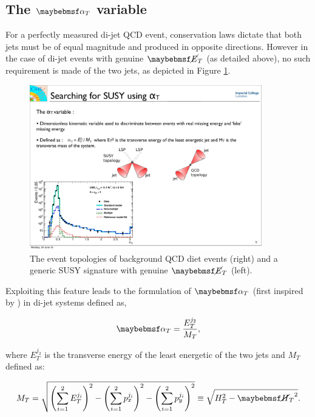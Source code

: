 \subsection{The $\alphat$ variable}
\label{subsec:alphatvariable}

For a perfectly measured di-jet QCD event, conservation laws dictate that both jets must be of equal magnitude and produced in opposite directions. However in the case of di-jet events with genuine $\met$ (as detailed above), no such requirement is made of the two jets, as depicted in Figure \ref{fig:susytopology}.
\begin{figure}[!h]
\centering
\includegraphics[width=0.90\textwidth]{plots/susy_topology.pdf}
\caption[The event topologies of background QCD diet events (right) and a generic \ac{SUSY} signature with genuine $\met$ (left).]{The event topologies of background QCD diet events (right) and a generic \ac{SUSY} signature with genuine $\met$ (left).}  
\label{fig:susytopology}
\end{figure}

 Exploiting this feature leads to the formulation of $\alphat$ (first inspired by \cite{PhysRevLett.101.221803}) in di-jet systems defined as,

\begin{equation}
\alphat = \frac {E^{j_{2}}_{T}}{M_{T}},
\end{equation} 

where $E^{j_{2}}_{T}$ is the transverse energy of the least energetic of the two jets and $M_{T}$ defined as:

\begin{equation}
\label{eq:transmass}
M_{T} = \sqrt{\left(\sum^{2}_{i=1}E^{j_{i}}_{T}\right)^{2}-\left(\sum^{2}_{i=1}p^{j_{i}}_{x}\right)^{2}-\left(\sum^{2}_{i=1}p^{j_{i}}_{y}\right)^{2}} \equiv \sqrt{H_{T}^{2} - \mht^{2}} .
\end{equation}


